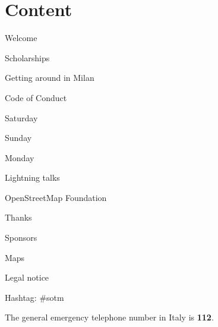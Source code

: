 \section*{Content}

\vspace*{0.35em}%
\noindent Welcome\dotfill \pageref{welcome}

\vspace*{0.35em}%
\noindent Scholarships \dotfill \pageref{scholarships}

\vspace*{0.35em}%
\noindent Getting around in Milan \dotfill \pageref{getting-around}

\vspace*{0.35em}%
\noindent Code of Conduct \dotfill \pageref{coc}

\vspace*{0.35em}%
\noindent Saturday \dotfill \pageref{saturday}

\vspace*{0.35em}%
\noindent Sunday \dotfill \pageref{sunday}

\vspace*{0.35em}%
\noindent Monday \dotfill \pageref{monday}

\vspace*{0.35em}%
\noindent Lightning talks \dotfill \pageref{lightning-talks}

\vspace*{0.35em}%
\noindent OpenStreetMap Foundation \dotfill \pageref{osmf}

\vspace*{0.35em}%
\noindent Thanks \dotfill \pageref{thanks}

\vspace*{0.35em}%
\noindent Sponsors \dotfill \pageref{sponsors}

\vspace*{0.35em}%
\noindent Maps \dotfill \pageref{maps}

\vspace*{0.35em}%
\noindent Legal notice \dotfill \pageref{legal}

\vfill
\noindent
Hashtag: \#sotm

\vspace*{0.8em}%
\noindent
The general emergency telephone number in Italy is \textbf{112}.
\vfill

\newpage

